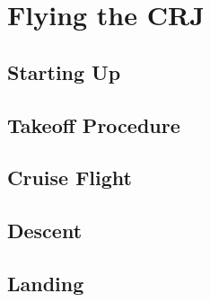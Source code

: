 \chapter{Flying the CRJ}
\section{Starting Up}
\section{Takeoff Procedure}
\section{Cruise Flight}
\section{Descent}
\section{Landing}